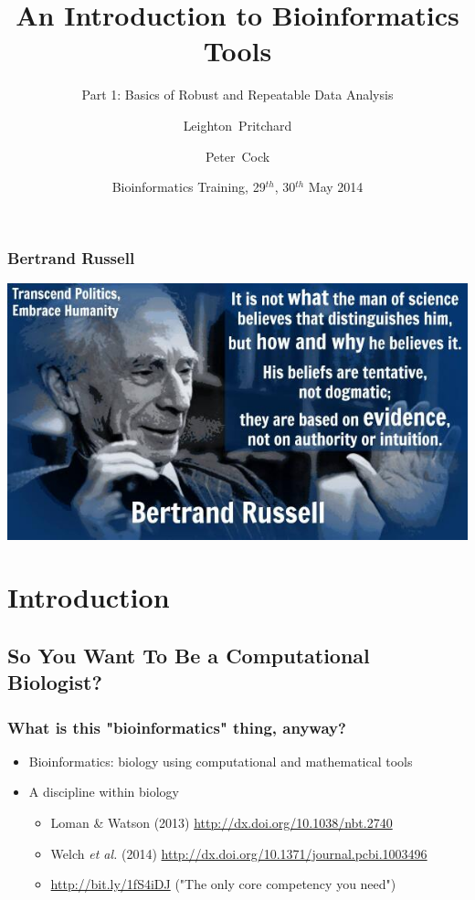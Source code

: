 \documentclass[table]{beamer}
\title[Intro to Bioinformatics] %
{An Introduction to Bioinformatics Tools}
\subtitle{Part 1: Basics of Robust and Repeatable Data Analysis}
\author[Pritchard, Cock] %
{Leighton~Pritchard \and Peter~Cock}
\institute[The James Hutton Institute] %
{
  Information and Computational Sciences\\
  The James Hutton Institute
}
\date[May 2014] %
{Bioinformatics Training, 29$^{th}$, 30$^{th}$ May 2014}
\begin{document}
  \frame[plain]{\titlepage}
  
  \begin{frame}
    \frametitle{Bertrand Russell}
    \begin{center}
      \includegraphics[width=\textwidth]{images/bertrand}
    \end{center}
  \end{frame}
    
  \section{Introduction}
  \subsection{So You Want To Be a Computational Biologist?}
  \begin{frame}
    \frametitle{What is this "bioinformatics" thing, anyway?}
    \begin{itemize}
      \item Bioinformatics: biology using computational and mathematical tools
      \item A discipline within biology
      \begin{itemize}
        \item Loman \& Watson (2013) \url{http://dx.doi.org/10.1038/nbt.2740}
        \item Welch \textit{et al.} (2014) \url{http://dx.doi.org/10.1371/journal.pcbi.1003496}
        \item \url{http://bit.ly/1fS4iDJ} ("The only core competency you need")
      \end{itemize}
    \end{itemize}
  \end{frame}
\end{document}
